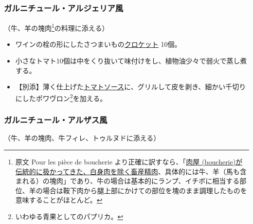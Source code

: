 \begin{recette}

\hypertarget{garniture-algerienne}{%
\subsubsection{ガルニチュール・アルジェリア風}\label{garniture-algerienne}}



（牛、羊の塊肉\footnote{原文 Pour les pièce de boucherie
  より正確に訳すなら、「\ul{肉屋
  (boucherie)が伝統的に扱かってきた、白身肉を除く畜産精肉}、具体的には牛、羊（馬も含まれる）の塊肉」であり、牛の場合は基本的にランプ、イチボに相当する部位、羊の場合は鞍下肉から腿上部にかけての部位を塊のまま調理したものを意味することがほとんど。}の料理に添える）

\begin{itemize}
\item
  ワインの栓の形にしたさつまいもの\protect\hyperlink{croquettes}{クロケット}
  10個。
\item
  小さなトマト10個は中をくり抜いて味付けをし、植物油少々で弱火で蒸し煮する。
\item
  【別添】薄く仕上げた\protect\hyperlink{sauce-tomate}{トマトソース}に、グリルして皮を剥き、細かい千切りにしたポワヴロン\footnote{いわゆる青果としてのパプリカ。}を加える。
\end{itemize}

\atoaki{}

\hypertarget{garniture-alsacienne}{%
\subsubsection{ガルニチュール・アルザス風}\label{garniture-alsacienne}}



（牛、羊の塊肉、牛フィレ、トゥルヌドに添える）


\end{recette}
